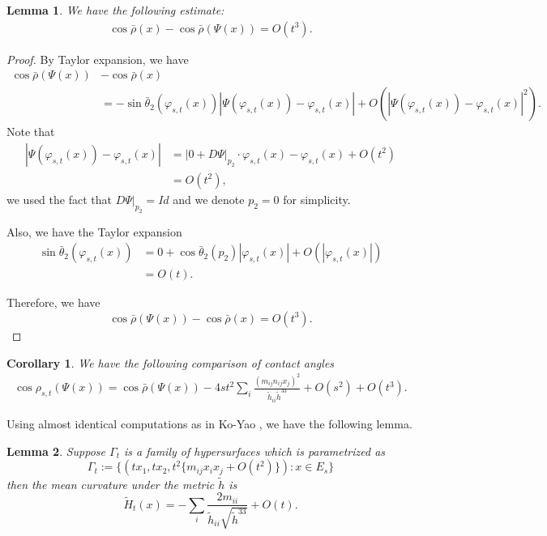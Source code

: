 \documentclass[11pt,letterpaper]{amsart}
\newtheorem{cor}{Corollary}[section]
\newtheorem{lem}{Lemma}[section]
\begin{document}
\begin{lem}
    We have the following estimate:
    \begin{align}
        \cos\bar{\rho}(x)-\cos\bar{\rho}(\Psi(x))=O(t^3).
    \end{align}
\end{lem}
\begin{proof}
    By Taylor expansion, we have
    \begin{align*}
        \cos\bar{\rho}(\Psi(x))&-\cos\bar{\rho}(x)\\
        &=-\sin\bar{\theta}_2(\varphi_{s,t}(x))|\Psi(\varphi_{s,t}(x))-\varphi_{s,t}(x)|+O(|\Psi(\varphi_{s,t}(x))-\varphi_{s,t}(x)|^2).
        \end{align*}
        Note that
        \begin{align*}
            |\Psi(\varphi_{s,t}(x))-\varphi_{s,t}(x)|&=|0+D\Psi|_{p_2}\cdot \varphi_{s,t}(x)-\varphi_{s,t}(x)+O(t^2)\\
            &=O(t^2),
        \end{align*}
        we used the fact that $D\Psi|_{p_2}=Id$ and we denote $p_2=0$ for simplicity.
        
        Also, we have the Taylor expansion
        \begin{align*}
            \sin\bar{\theta}_2(\varphi_{s,t}(x))&=0+\cos\bar{\theta}_2(p_2)|\varphi_{s,t}(x)|+O(|\varphi_{s,t}(x)|)\\
            &=O(t).
        \end{align*}

        Therefore, we have 
        \[
        \cos\bar{\rho}(\Psi(x))-\cos\bar{\rho}(x)=O(t^3).
        \]
\end{proof}

\begin{cor}
     We have the following comparison of contact angles
    \begin{align}
        \cos\rho_{s,t}(\Psi(x))=\cos\bar{\rho}(\Psi(x))-4st^2\sum_{i}\frac{(m_{ij}n_{ij}x_j)^2}{\tilde{h}_{ii}\tilde{h}^{33}}+O(s^2)+O(t^3).
    \end{align}
\end{cor}


Using almost identical computations as in Ko-Yao \cite{koyao}, we have the following lemma.

\begin{lem}
    Suppose $\Gamma_t$ is a family of hypersurfaces which is parametrized as 
    \[
    \Gamma_t:=\{(tx_1,tx_2,t^2\{m_{ij}x_ix_j+O(t^2)\}): x\in E_s\}
    \]
    then the mean curvature under the metric $\tilde{h}$ is 
    \[
    \tilde{H}_t(x)=-\sum_i\frac{2m_{ii}}{\tilde{h}_{ii}\sqrt{\tilde{h}^{33}}}+O(t).
    \]
\end{lem}
\end{document}
